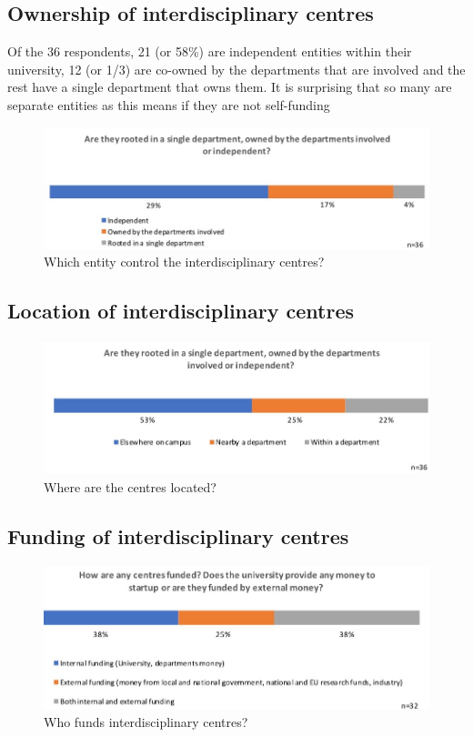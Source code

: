 \subsection{ Ownership of interdisciplinary centres}

Of the 36 respondents, 21 (or 58\%) are independent entities within their university, 12 (or 1/3) are co-owned by the departments that are involved and the rest have a single department that owns them. It is surprising that so many are separate entities as this means if they are not self-funding

\begin{figure}[h]
\centering
\includegraphics[width = \linewidth]{charts/5c.jpg}
\caption{Which entity control the interdisciplinary centres?}
\label{sect5:owners}
\end{figure}

\subsection{ Location of interdisciplinary centres}

\begin{figure}[h]
\centering
\includegraphics[width = \linewidth]{charts/5d.jpg}
\caption{ Where are the centres located?}
\label{sect5:locations}
\end{figure}

\subsection{Funding of interdisciplinary centres}

\begin{figure}[h]
\centering
\includegraphics[width = \linewidth]{charts/5e.jpg}
\caption{Who funds interdisciplinary centres?}
\label{sect5:funding}
\end{figure}

